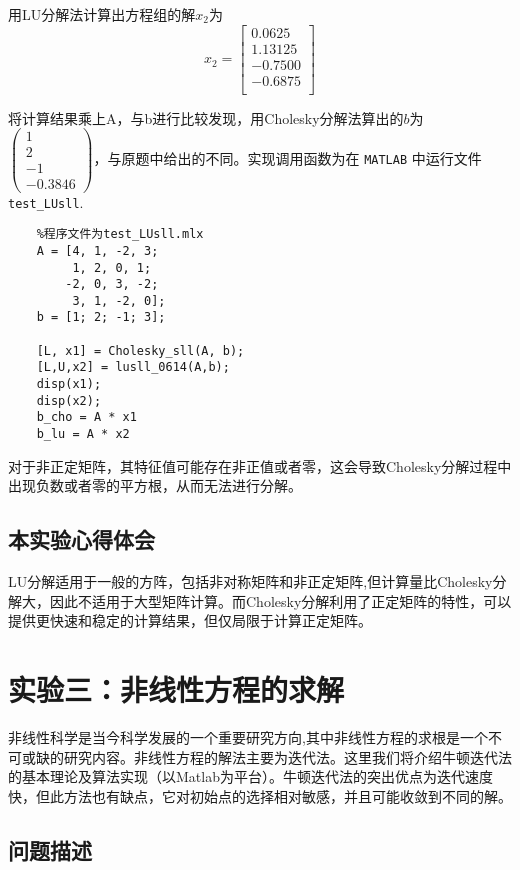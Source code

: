 \documentclass[12pt, a4paper, oneside]{ctexart}
\begin{document}
用LU分解法计算出方程组的解$x_2$为\[
x_2 = \begin{bmatrix}
	0.0625 \\
	1.13125 \\
	-0.7500 \\
	-0.6875 \\
\end{bmatrix}
\]

将计算结果乘上A，与b进行比较发现，用Cholesky分解法算出的\(b\)为 \(\begin{pmatrix} 1 \\ 2 \\ -1 \\ -0.3846 \end{pmatrix}\)，与原题中给出的不同。实现调用函数为在 \texttt{MATLAB} 中运行文件 \texttt{test\_LUsll}.

\begin{lstlisting}
	%程序文件为test_LUsll.mlx
	A = [4, 1, -2, 3;
	   	 1, 2, 0, 1;
		-2, 0, 3, -2;
		 3, 1, -2, 0];
	b = [1; 2; -1; 3];
	
	[L, x1] = Cholesky_sll(A, b);
	[L,U,x2] = lusll_0614(A,b);
	disp(x1);
	disp(x2);
	b_cho = A * x1
	b_lu = A * x2
\end{lstlisting}

  对于非正定矩阵，其特征值可能存在非正值或者零，这会导致Cholesky分解过程中出现负数或者零的平方根，从而无法进行分解。
		
	\subsection{本实验心得体会}
	LU分解适用于一般的方阵，包括非对称矩阵和非正定矩阵,但计算量比Cholesky分解大，因此不适用于大型矩阵计算。而Cholesky分解利用了正定矩阵的特性，可以提供更快速和稳定的计算结果，但仅局限于计算正定矩阵。
	
	\section{实验三：非线性方程的求解}
	
	非线性科学是当今科学发展的一个重要研究方向,其中非线性方程的求根是一个不可或缺的研究内容。非线性方程的解法主要为迭代法。这里我们将介绍牛顿迭代法的基本理论及算法实现（以Matlab为平台）。牛顿迭代法的突出优点为迭代速度快，但此方法也有缺点，它对初始点的选择相对敏感，并且可能收敛到不同的解。
		
	\subsection{问题描述}
		
\end{document}
